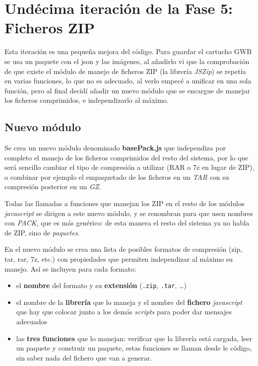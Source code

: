 \section{Undécima iteración de la Fase 5: Ficheros ZIP}\label{sec:F5I11}

Esta iteración es una pequeña mejora del código. Para guardar el cartucho GWB se usa un paquete con el json y las imágenes, al añadirlo vi que la comprobación de que existe el módulo de manejo de ficheros ZIP (la librería \emph{JSZip}) se repetía en varias funciones, lo que no es adecuado, al verlo empecé a unificar en una sola función, pero al final decidí añadir un nuevo módulo que se encargue de manejar los ficheros comprimidos, e independizarlo al máximo.

\subsection{Nuevo módulo}
\label{sec:F5I11Modulo}

Se crea un nuevo módulo denominado \textbf{basePack.js} que independiza por completo el manejo de los ficheros comprimidos del resto del sistema, por lo que será sencillo cambiar el tipo de compresión a utilizar (RAR o 7z en lugar de ZIP), o combinar por ejemplo el empaquetado de los ficheros en un \emph{TAR} con su compresión posterior en un \emph{GZ}.

Todas las llamadas a funciones que manejan los ZIP en el resto de los módulos \emph{javascript} se dirigen a este nuevo módulo, y se renombran para que usen nombres con \emph{PACK}, que es más genérico: de esta manera el resto del sistema ya no habla de ZIP, sino de \emph{paquetes}.

En el nuevo módulo se crea una lista de posibles formatos de compresión (zip, tar, rar, 7z, etc.) con propiedades que permiten independizar al máximo su manejo. Así se incluyen para cada formato:
\begin{itemize}
	\item el \textbf{nombre} del formato y su \textbf{extensión} (\texttt{.zip}, \texttt{.tar}, \dots)
	\item el nombre de la \textbf{librería} que lo maneja y el nombre del \textbf{fichero} \emph{javascript} que hay que colocar junto a los demás \emph{scripts} para poder dar mensajes adecuados
	\item las \textbf{tres funciones} que lo manejan: verificar que la librería está cargada, leer un paquete y construir un paquete, estas funciones se llaman desde le código, sin saber nada del fichero que van a generar.
\end{itemize}

